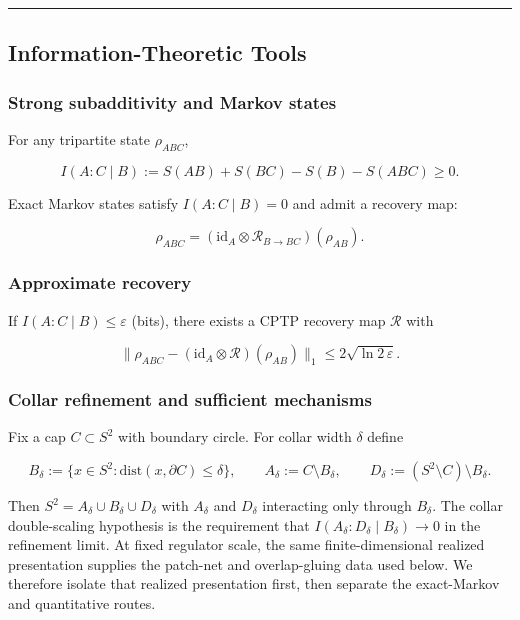 \begin{center}\rule{0.5\linewidth}{0.5pt}\end{center}
\subsection{Information-Theoretic Tools}\label{2-information-theoretic-tools}

\subsubsection{Strong subadditivity and Markov states}\label{21-strong-subadditivity-and-markov-states}

For any tripartite state \(\rho_{ABC}\),

\[
I(A:C \mid B) := S(AB) + S(BC) - S(B) - S(ABC) \ge 0.
\]

Exact Markov states satisfy \(I(A:C \mid B) = 0\) and admit a recovery map:

\[
\rho_{ABC} = (\mathrm{id}_A \otimes \mathcal R_{B\to BC})(\rho_{AB}).
\]

\subsubsection{Approximate recovery}\label{22-approximate-recovery}

If \(I(A:C \mid B) \le \varepsilon\) (bits), there exists a CPTP recovery map \(\mathcal{R}\) with

\[
\| \rho_{ABC} - (\mathrm{id}_A \otimes \mathcal R)(\rho_{AB}) \|_1
\le 2 \sqrt{\ln 2\, \varepsilon}.
\]

\subsubsection{Collar refinement and sufficient mechanisms}\label{23-collar-refinement-and-sufficient-mechanisms}

Fix a cap \(C \subset S^2\) with boundary circle. For collar width \(\delta\) define

\[
B_\delta := \{x \in S^2 : \mathrm{dist}(x,\partial C) \le \delta\},
\qquad
A_\delta := C \setminus B_\delta,
\qquad
D_\delta := (S^2 \setminus C) \setminus B_\delta.
\]

Then \(S^2 = A_\delta \cup B_\delta \cup D_\delta\) with \(A_\delta\) and \(D_\delta\) interacting only through \(B_\delta\). The collar double-scaling hypothesis is the requirement that \(I(A_\delta:D_\delta \mid B_\delta) \to 0\) in the refinement limit. At fixed regulator scale, the same finite-dimensional realized presentation supplies the patch-net and overlap-gluing data used below. We therefore isolate that realized presentation first, then separate the exact-Markov and quantitative routes.

